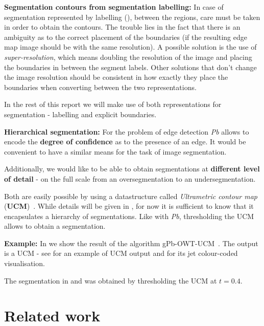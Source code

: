 \textbf{Segmentation contours from segmentation labelling:} In case of segmentation represented by labelling (),  between the regions, care must be taken in order to obtain the contours. The trouble lies in the fact that there is an ambiguity as to the correct placement of the boundaries (if the resulting edge map image should be with the same resolution). A possible solution is the use of {\it super-resolution}, which means doubling the resolution of the image and placing the boundaries in between the segment labels. Other solutions that don't change the image %
resolution should be consistent in how exactly they place the %
boundaries when converting between the two representations.

In the rest of this report we will make use of both representations for segmentation - labelling and explicit boundaries.

\textbf{Hierarchical segmentation:} 
For the problem of edge detection {\it Pb} allows to encode the {\bf degree of confidence} as to the presence of an edge. It would be convenient to have a similar means for the task of image segmentation. 

Additionally, we would like to be able to obtain segmentations at {\bf different level of detail} - on the full scale from an oversegmentation to an undersegmentation. 

Both are %
easily possible by using a datastructure called {\it Ultrametric contour map} ({\bf UCM})~\cite{Arbelaez2006boundary}. While details will be given in , for now it is sufficient to know that it encapsulates a hierarchy of segmentations. 
Like with {\it Pb}, thresholding the UCM allows to obtain a segmentation.

\textbf{Example:} In  we show the result of the algorithm gPb-OWT-UCM~\cite{Arbelaez11}. The output is a UCM - see  for an example of UCM output and  for its jet colour-coded visualisation.

The segmentation in  and  was obtained by thresholding the UCM at $t=0.4$.

\section{Related work}
